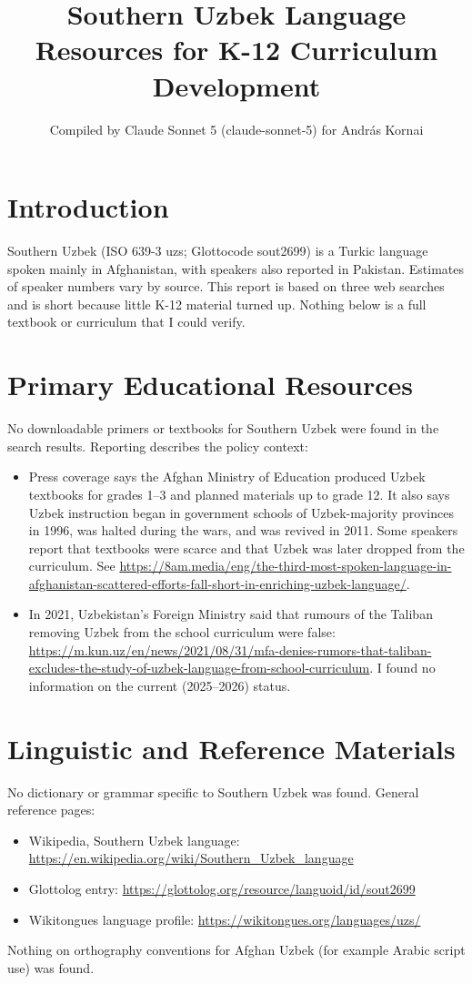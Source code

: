 \documentclass[12pt]{article}
\title{Southern Uzbek Language Resources for K-12 Curriculum Development}
\author{Compiled by Claude Sonnet 5 (claude-sonnet-5) for Andr\'as Kornai}
\date{}
\begin{document}
\maketitle

\section{Introduction}
Southern Uzbek (ISO 639-3 uzs; Glottocode sout2699) is a Turkic language spoken mainly in Afghanistan, with speakers also reported in Pakistan. Estimates of speaker numbers vary by source. This report is based on three web searches and is short because little K-12 material turned up. Nothing below is a full textbook or curriculum that I could verify.

\section{Primary Educational Resources}
No downloadable primers or textbooks for Southern Uzbek were found in the search results. Reporting describes the policy context:
\begin{itemize}
\item Press coverage says the Afghan Ministry of Education produced Uzbek textbooks for grades 1--3 and planned materials up to grade 12. It also says Uzbek instruction began in government schools of Uzbek-majority provinces in 1996, was halted during the wars, and was revived in 2011. Some speakers report that textbooks were scarce and that Uzbek was later dropped from the curriculum. See \url{https://8am.media/eng/the-third-most-spoken-language-in-afghanistan-scattered-efforts-fall-short-in-enriching-uzbek-language/}.
\item In 2021, Uzbekistan's Foreign Ministry said that rumours of the Taliban removing Uzbek from the school curriculum were false: \url{https://m.kun.uz/en/news/2021/08/31/mfa-denies-rumors-that-taliban-excludes-the-study-of-uzbek-language-from-school-curriculum}. I found no information on the current (2025--2026) status.
\end{itemize}

\section{Linguistic and Reference Materials}
No dictionary or grammar specific to Southern Uzbek was found. General reference pages:
\begin{itemize}
\item Wikipedia, Southern Uzbek language: \url{https://en.wikipedia.org/wiki/Southern_Uzbek_language}
\item Glottolog entry: \url{https://glottolog.org/resource/languoid/id/sout2699}
\item Wikitongues language profile: \url{https://wikitongues.org/languages/uzs/}
\end{itemize}
Nothing on orthography conventions for Afghan Uzbek (for example Arabic script use) was found.
\end{document}

